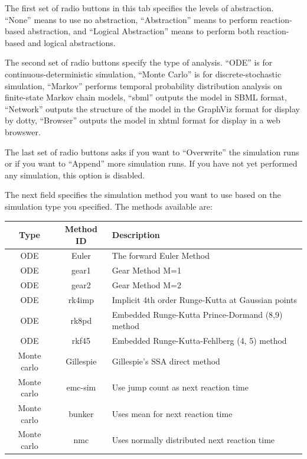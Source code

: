 \documentclass[titlepage,11pt]{article}
\begin{document}
The first set of radio buttons in this tab specifies the
levels of abstraction. ``None'' means to use no abstraction,
``Abstraction'' means to perform reaction-based abstraction, and
``Logical Abstraction'' means to perform both reaction-based and
logical abstractions.

The second set of radio buttons specify the type of analysis.
``ODE'' is for continuous-deterministic simulation,
``Monte Carlo'' is for discrete-stochastic simulation,
``Markov'' performs temporal probability distribution
analysis on finite-state Markov chain models, ``sbml''
outputs the model in SBML format, ``Network'' outputs the
structure of the model in the GraphViz format for display by dotty, 
``Browser'' outputs the model in xhtml format for display
in a web browswer.

The last set of radio buttons asks if you want to ``Overwrite''
the simulation runs or if you want to ``Append'' more
simulation runs. 
If you have not yet performed any simulation, this option is disabled.

The next field specifies the simulation method you want to use
based on the simulation type you specified. The methods available
are:

\begin{center}
\begin{tabular}{|c|c|l|}
\hline
Type & Method ID & Description \\ \hline \hline
ODE  & Euler     & The forward Euler Method \\ \hline
ODE  & gear1     & Gear Method M=1 \\ \hline
ODE  & gear2     & Gear Method M=2 \\ \hline
ODE  & rk4imp    & Implicit 4th order Runge-Kutta at Gaussian points \\ \hline
ODE  & rk8pd     & Embedded Runge-Kutta Prince-Dormand (8,9) method \\ \hline
ODE  & rkf45     & Embedded Runge-Kutta-Fehlberg (4, 5) method \\ \hline
Monte carlo & Gillespie & Gillespie's SSA direct method \\ \hline
Monte carlo & emc-sim   & Use jump count as next reaction time \\ \hline
Monte carlo & bunker    & Uses mean for next reaction time \\ \hline
Monte carlo & nmc       & Uses normally distributed next reaction time
\\ \hline
\end{tabular}
\end{center}
\end{document}
